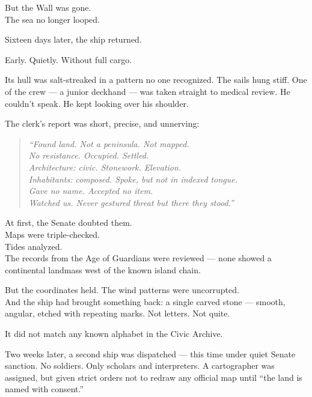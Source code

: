 \documentclass[12pt]{article}
\begin{document}
But the Wall was gone.\\
The sea no longer looped.

\vspace{1em}

Sixteen days later, the ship returned.

Early. Quietly. Without full cargo.

Its hull was salt-streaked in a pattern no one recognized. The sails hung stiff. One of the crew --- a junior deckhand --- was taken straight to medical review. He couldn’t speak. He kept looking over his shoulder.

The clerk’s report was short, precise, and unnerving:

\begin{quote}
\textit{“Found land. Not a peninsula. Not mapped.}\\
\textit{No resistance. Occupied. Settled.}\\
\textit{Architecture: civic. Stonework. Elevation.}\\
\textit{Inhabitants: composed. Spoke, but not in indexed tongue.}\\
\textit{Gave no name. Accepted no item.}\\
\textit{Watched us. Never gestured threat but there they stood.”}
\end{quote}

\vspace{1em}

At first, the Senate doubted them.\\
Maps were triple-checked.\\
Tides analyzed.\\
The records from the Age of Guardians were reviewed --- none showed a continental landmass west of the known island chain.

But the coordinates held. The wind patterns were uncorrupted.\\
And the ship had brought something back: a single carved stone --- smooth, angular, etched with repeating marks. Not letters. Not quite.

It did not match any known alphabet in the Civic Archive.

\vspace{1em}

Two weeks later, a second ship was dispatched --- this time under quiet Senate sanction. No soldiers. Only scholars and interpreters. A cartographer was assigned, but given strict orders not to redraw any official map until ``the land is named with consent.”
\end{document}
